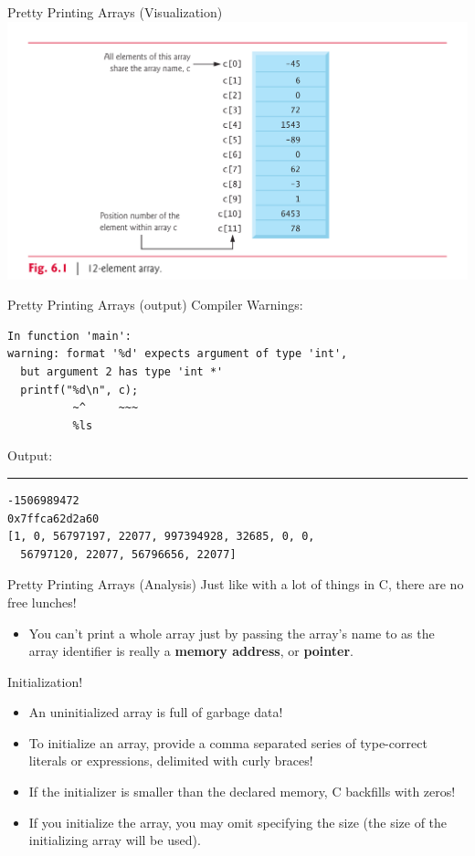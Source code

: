 \documentclass[11pt]{beamer}
\let\OldTexttt\texttt
\renewcommand{\texttt}[1]{\OldTexttt{\color{teal}{#1}}}
\begin{document}
\begin{frame}{Pretty Printing Arrays (Visualization)}
\center
\includegraphics[scale=0.1]{array.png}
\end{frame}

\begin{frame}[fragile=singleslide]{Pretty Printing Arrays (output)}
Compiler Warnings:
\begin{lstlisting}[style=terminal]
In function 'main':
warning: format '%d' expects argument of type 'int', 
  but argument 2 has type 'int *'
  printf("%d\n", c);
          ~^     ~~~
          %ls
\end{lstlisting}
Output:
\hrule
\begin{lstlisting}[style=terminal]
-1506989472
0x7ffca62d2a60
[1, 0, 56797197, 22077, 997394928, 32685, 0, 0, 
  56797120, 22077, 56796656, 22077]
\end{lstlisting}
\end{frame}

\begin{frame}{Pretty Printing Arrays (Analysis)}
Just like with a lot of things in C, there are no free lunches! 
\begin{itemize}
\item You can't print a whole array just by passing the array's name to \texttt{printf} as the array identifier is really a \textbf{memory address}, or \textbf{pointer}.
\end{itemize}
Initialization!
\begin{itemize}
\item An uninitialized array is full of garbage data! 
\item To initialize an array, provide a comma separated series of type-correct literals or expressions, delimited with curly braces! 
\item If the initializer is smaller than the declared memory, C backfills with zeros!
\item If you initialize the array, you may omit specifying the size (the size of the initializing array will be used).
\end{itemize}
\end{frame}
\end{document}
